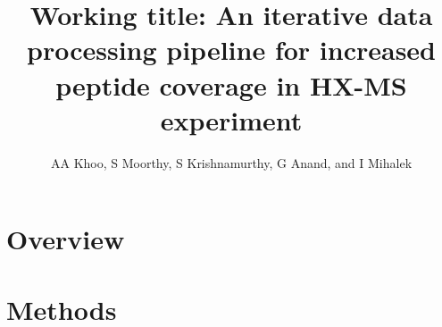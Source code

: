 \documentclass[10pt]{scrartcl}
\title{Working title: An iterative data processing  pipeline for increased peptide coverage in HX-MS experiment}
\author{AA Khoo, S Moorthy, S Krishnamurthy, G Anand, and I Mihalek}
\begin{document}
\maketitle
\begin{abstract}


\end{abstract}


\section{Overview}
\section{Methods}



 
\end{document}

